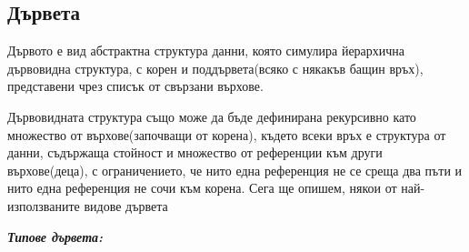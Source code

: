 \documentclass[11pt]{article} %
\newcommand{\italicBold}[1]{\textbf{\emph{#1}}}
\begin{document}
\subsection{Дървета}
Дървото е вид абстрактна структура данни, която симулира йерархична дървовидна структура, с корен и поддървета(всяко с някакъв бащин връх), представени чрез списък от свързани върхове.\par
Дървовидната структура също може да бъде дефинирана рекурсивно като множество от върхове(започващи от корена), където всеки връх е структура от данни, съдържаща стойност и множество от референции към други върхове(деца), с ограничението, че нито една референция не се среща два пъти и нито една референция не сочи към корена. Сега ще опишем, някои от най-използваните видове дървета\\\par
\italicBold{Типове дървета: }\\
\end{document}
